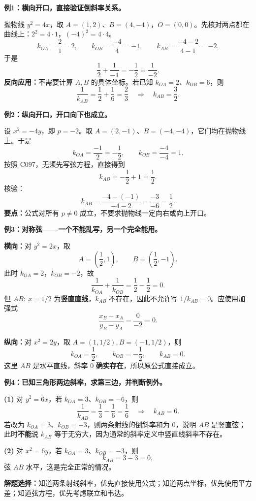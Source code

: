 \clearpage
\begin{examplebox}
\textbf{例1：横向开口，直接验证倒斜率关系。}

抛物线 $y^2=4x$，取 $A=(1,2)$、$B=(4,-4)$，$O=(0,0)$。先核对两点都在曲线上：$2^2=4\cdot1$，$(-4)^2=4\cdot4$。
\[
k_{OA}=\frac21=2,\qquad
k_{OB}=\frac{-4}{4}=-1,\qquad
k_{AB}=\frac{-4-2}{4-1}=-2.
\]
于是
\[
\boxed{\frac12+\frac1{-1}=-\frac12=\frac1{-2}}.
\]
\textbf{反向应用：}不需要计算 $A,B$ 的具体坐标。若已知 $k_{OA}=2$、$k_{OB}=6$，则
\[
\frac1{k_{AB}}=\frac12+\frac16=\frac23
\quad\Longrightarrow\quad\boxed{k_{AB}=\frac32}.
\]
\end{examplebox}

\clearpage
\begin{examplebox}
\textbf{例2：纵向开口，开口向下也成立。}
\begin{center}\end{center}

设 $x^2=-4y$，即 $p=-2$。取 $A=(2,-1)$、$B=(-4,-4)$，它们均在抛物线上。于是
\[
k_{OA}=\frac{-1}{2}=-\frac12,\qquad
k_{OB}=\frac{-4}{-4}=1.
\]
按照 C097，无须先写弦方程，直接得到
\[
\boxed{k_{AB}=-\frac12+1=\frac12}.
\]
核验：
\[
k_{AB}=\frac{-4-(-1)}{-4-2}
=\frac{-3}{-6}=\frac12.
\]
\textbf{要点：}公式对所有 $p\ne0$ 成立，不要求抛物线一定向右或向上开口。
\end{examplebox}

\clearpage
\begin{examplebox}
\textbf{例3：对称弦——一个不能乱写，另一个完全能用。}
\begin{center}\end{center}

\textbf{横向：}对 $y^2=2x$，取
\[
A=\left(\frac12,1\right),\qquad B=\left(\frac12,-1\right).
\]
此时 $k_{OA}=2$，$k_{OB}=-2$，故
\[
\frac1{k_{OA}}+\frac1{k_{OB}}=\frac12-\frac12=0.
\]
但 $AB:\ x=1/2$ 为\textbf{竖直直线}，$k_{AB}$ 不存在，因此不允许写 $1/k_{AB}=0$。应使用加强式
\[
\frac{x_B-x_A}{y_B-y_A}=\frac0{-2}=0.
\]

\medskip
\textbf{纵向：}对 $x^2=2y$，取 $A=(1,1/2), B=(-1,1/2)$，则
\[
k_{OA}=\frac12,\qquad k_{OB}=-\frac12,
\qquad\boxed{k_{AB}=0}.
\]
这里 $AB$ 是水平直线，斜率 $0$ \textbf{确实存在}，所以原公式直接成立。
\end{examplebox}

\clearpage
\begin{examplebox}
\textbf{例4：已知三角形两边斜率，求第三边，并判断例外。}

\textbf{(1)} 对 $y^2=6x$，若 $k_{OA}=3$、$k_{OB}=-6$，则
\[
\frac1{k_{AB}}=\frac13-\frac16=\frac16
\quad\Longrightarrow\quad\boxed{k_{AB}=6}.
\]
若改为 $k_{OA}=3$、$k_{OB}=-3$，则两条射线的倒斜率和为 $0$，说明 $AB$ 是竖直弦；此时\textbf{不能}说 $k_{AB}$ 等于无穷大，因为通常的斜率定义中竖直线斜率不存在。

\medskip
\textbf{(2)} 对 $x^2=6y$，若 $k_{OA}=3$、$k_{OB}=-3$，则
\[
\boxed{k_{AB}=3-3=0},
\]
弦 $AB$ 水平，这是完全正常的情况。

\textbf{解题选择：}知道两条射线斜率，优先直接使用公式；知道两点坐标，优先使用平方差；知道弦方程，优先考虑联立和韦达。
\end{examplebox}

